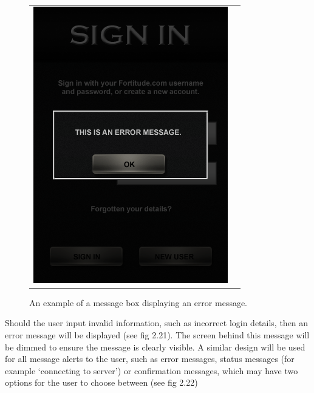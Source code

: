 \begin{figure}[h!]
\begin{tabular}{cc}
\begin{minipage}{0.3\textwidth}
\begin{center}
\begin{minipage}{0.83\textwidth}
		\includegraphics[width=\textwidth]{images/message_box_in_use_mockup}
		\caption{An example of a message box displaying an error message.}
		\label{message_box}
		\end{minipage}
		\end{center}
	\end{minipage}
\end{tabular}
\vspace{-0pt}
\end{figure}

Should the user input invalid information, such as incorrect login details, then an error message will be displayed (see fig 2.21). The screen behind this message will be dimmed to ensure the message is clearly visible. A similar design will be used for all message alerts to the user, such as error messages, status messages (for example `connecting to server') or confirmation messages, which may have two options for the user to choose between (see fig 2.22)

